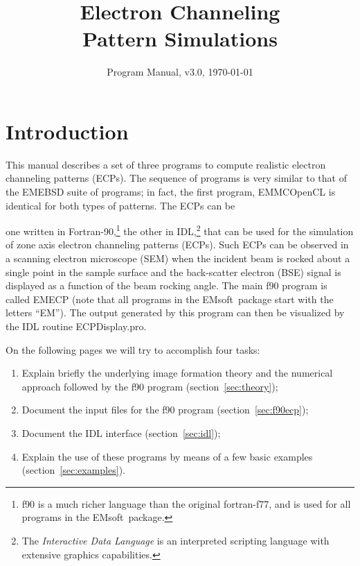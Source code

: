 \documentclass[DIV=calc, paper=letter, fontsize=11pt]{scrartcl}	 %
\title{Electron Channeling\\ Pattern Simulations} %
\author{\vspace*{-0.7in}} %
\date{Program Manual, v3.0, \today}
\newcommand{\ctp}{\textsf{EMsoft}}
\begin{document}
\maketitle

\begin{figure*}[h]
\leavevmode\centering
{}
\end{figure*}

\renewcommand{\contentsname}{Table of Contents}
{\small\tableofcontents}

\newpage
\section{Introduction}
This manual describes a set of three programs to compute realistic electron channeling patterns (ECPs).  The sequence of programs is 
very similar to that of the \textsf{EMEBSD} suite of programs; in fact, the first program, \textsf{EMMCOpenCL} is identical for both
types of patterns.  The ECPs can be 


one written in Fortran-90,\footnote{f90 is a much richer language than the original fortran-f77, and is
used for all programs in the \ctp\ package.} 
the other in IDL,\footnote{The \textit{Interactive Data Language} is an interpreted scripting language with extensive graphics capabilities.} 
that can be used for the simulation of zone axis electron channeling patterns (ECPs).  Such ECPs can be
observed in a scanning electron microscope (SEM) when the incident beam is rocked about a single point in the sample surface and 
the back-scatter electron (BSE) signal is displayed as a function of the beam rocking angle.  The main f90 program
is called \textsf{EMECP} (note that all programs in the \ctp\ package start with the letters ``EM'').
The output generated by this program can then be visualized by the IDL routine \textsf{ECPDisplay.pro}.  

On the following pages we will try to accomplish four tasks:
\begin{enumerate}
	\item Explain briefly the underlying image formation theory and the numerical approach followed by the f90 program (section~\ref{sec:theory});
	\item Document the input files for the f90 program (section~\ref{sec:f90ecp});
	\item Document the IDL interface (section~\ref{sec:idl});
	\item Explain the use of these programs by means of a few basic examples (section~\ref{sec:examples}).
\end{enumerate}
\end{document}
